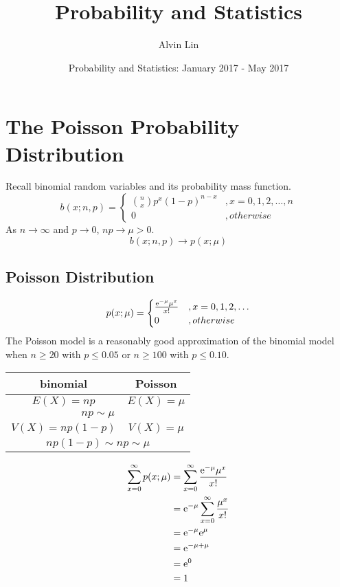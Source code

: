\documentclass{math}
\title{Probability and Statistics}
\author{Alvin Lin}
\date{Probability and Statistics: January 2017 - May 2017}
\begin{document}
\maketitle

\section*{The Poisson Probability Distribution}
Recall binomial random variables and its probability mass function.
\[ b(x;n,p) =
  \begin{cases}
    \binom{n}{x}p^{x}(1-p)^{n-x} &, x = 0,1,2,\dots,n \\
    0 &, otherwise
  \end{cases}
\]
As \( n\to\infty \) and \( p\to 0 \), \( np\to\mu > 0 \).
\[ b(x;n,p)\to p(x;\mu) \]

\subsection*{Poisson Distribution}
\[ p(x;\mu) =
  \begin{cases}
    \frac{\mathrm{e}^{-\mu}\mu^{x}}{x!} &, x = 0,1,2,\dots \\
    0 &, otherwise
  \end{cases}
\]
The Poisson model is a reasonably good approximation of the binomial model
when \( n \geq 20 \) with \( p \leq 0.05 \) or \( n \geq 100 \) with
\( p \leq 0.10 \).
\begin{center}
  \begin{tabular}{|c|c|}
    \hline
    binomial & Poisson \\
    \hline
    \( E(X) = np \) & \( E(X) = \mu \) \\
    \hline
    \multicolumn{2}{|c|}{\( np \sim \mu \)} \\
    \hline
    \( V(X) = np(1-p) \) & \( V(X) = \mu \) \\
    \hline
    \multicolumn{2}{|c|}{\( np(1-p) \sim np \sim \mu \)} \\
    \hline
  \end{tabular}
\end{center}
\begin{align*}
  \sum_{x=0}^{\infty}p(x;\mu) &=
    \sum_{x=0}^{\infty}\frac{\mathrm{e}^{-\mu}\mu^{x}}{x!} \\
  &= \mathrm{e}^{-\mu}\sum_{x=0}^{\infty}\frac{\mu^{x}}{x!} \\
  &= \mathrm{e}^{-\mu}\mathrm{e}^{\mu} \\
  &= \mathrm{e}^{-\mu+\mu} \\
  &= \mathrm{e}^{0} \\
  &= 1
\end{align*}
\end{document}

